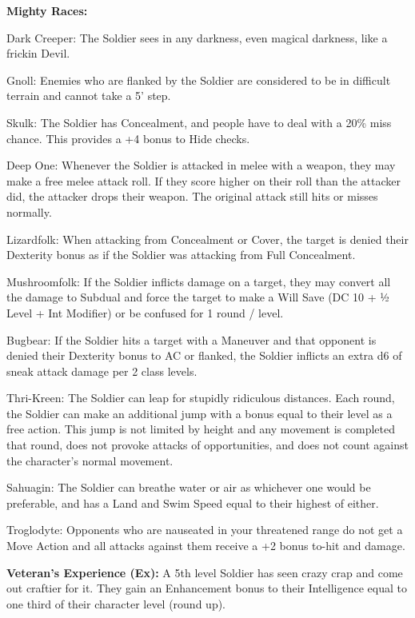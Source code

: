 \textbf{Mighty Races:}
\begin{description*}
\item[Dark Creeper:] The Soldier sees in any darkness, even magical darkness, like a frickin Devil.
\item[Gnoll:] Enemies who are flanked by the Soldier are considered to be in difficult terrain and cannot take a 5' step.
\item[Skulk:] The Soldier has Concealment, and people have to deal with a 20\% miss chance. This provides a +4 bonus to Hide checks.
\item[Deep One:] Whenever the Soldier is attacked in melee with a weapon, they may make a free melee attack roll. If they score higher on their roll than the attacker did, the attacker drops their weapon. The original attack still hits or misses normally.
\item[Lizardfolk:] When attacking from Concealment or Cover, the target is denied their Dexterity bonus as if the Soldier was attacking from Full Concealment.
\item[Mushroomfolk:] If the Soldier inflicts damage on a target, they may convert all the damage to Subdual and force the target to make a Will Save (DC 10 + ½ Level + Int Modifier) or be confused for 1 round / level.
\item[Bugbear:] If the Soldier hits a target with a Maneuver and that opponent is denied their Dexterity bonus to AC or flanked, the Soldier inflicts an extra d6 of sneak attack damage per 2 class levels.
\item[Thri-Kreen:] The Soldier can leap for stupidly ridiculous distances. Each round, the Soldier can make an additional jump with a bonus equal to their level as a free action. This jump is not limited by height and any movement is completed that round, does not provoke attacks of opportunities, and does not count against the character's normal movement.
\item[Sahuagin:] The Soldier can breathe water or air as whichever one would be preferable, and has a Land and Swim Speed equal to their highest of either.
\item[Troglodyte:] Opponents who are nauseated in your threatened range do not get a Move Action and all attacks against them receive a +2 bonus to-hit and damage.
\end{description*}

\textbf{Veteran's Experience (Ex):} A 5th level Soldier has seen crazy crap and come out craftier for it. They gain an Enhancement bonus to their Intelligence equal to one third of their character level (round up).

